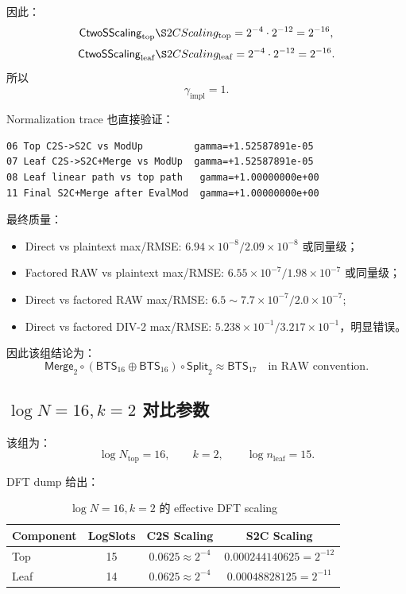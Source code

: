 \documentclass[UTF8,a4paper,11pt]{ctexart}
\newcommand{\Split}{\mathsf{Split}}
\newcommand{\Merge}{\mathsf{Merge}}
\newcommand{\BTS}{\mathsf{BTS}}
\newcommand{\CtwoSScaling}{\mathsf{CtwoSScaling}}
\begin{document}
因此：
\begin{equation}
\CtwoSScaling_{\mathrm{top}}\S2CScaling_{\mathrm{top}}
=2^{-4}\cdot2^{-12}=2^{-16},
\end{equation}
\begin{equation}
\CtwoSScaling_{\mathrm{leaf}}\S2CScaling_{\mathrm{leaf}}
=2^{-4}\cdot2^{-12}=2^{-16}.
\end{equation}
所以
\begin{equation}
\boxed{\gamma_{\mathrm{impl}}=1.}
\end{equation}

Normalization trace 也直接验证：
\begin{lstlisting}[style=textstyle,caption={$\log N=17,k=2$ normalization trace 摘要}]
06 Top C2S->S2C vs ModUp         gamma=+1.52587891e-05
07 Leaf C2S->S2C+Merge vs ModUp  gamma=+1.52587891e-05
08 Leaf linear path vs top path   gamma=+1.00000000e+00
11 Final S2C+Merge after EvalMod  gamma=+1.00000000e+00
\end{lstlisting}

最终质量：
\begin{itemize}[leftmargin=2em]
\item Direct vs plaintext max/RMSE: $6.94\times10^{-8}/2.09\times10^{-8}$ 或同量级；
\item Factored RAW vs plaintext max/RMSE: $6.55\times10^{-7}/1.98\times10^{-7}$ 或同量级；
\item Direct vs factored RAW max/RMSE: $6.5\sim7.7\times10^{-7}/2.0\times10^{-7}$;
\item Direct vs factored DIV-2 max/RMSE: $5.238\times10^{-1}/3.217\times10^{-1}$，明显错误。
\end{itemize}

因此该组结论为：
\begin{equation}
\boxed{
\Merge_2\circ(\BTS_{16}\oplus\BTS_{16})\circ\Split_2
\approx
\BTS_{17}
\quad\text{in RAW convention.}
}
\end{equation}

\subsection{$\log N=16,k=2$ 对比参数}

该组为：
\begin{equation}
\log N_{\mathrm{top}}=16,
\qquad
k=2,
\qquad
\log n_{\mathrm{leaf}}=15.
\end{equation}

DFT dump 给出：

\begin{table}[H]
\centering
\caption{$\log N=16,k=2$ 的 effective DFT scaling}
\begin{tabular}{lccc}
\toprule
Component & LogSlots & C2S Scaling & S2C Scaling \\
\midrule
Top & 15 & $0.0625\approx2^{-4}$ & $0.000244140625=2^{-12}$ \\
Leaf & 14 & $0.0625\approx2^{-4}$ & $0.00048828125=2^{-11}$ \\
\bottomrule
\end{tabular}
\end{table}
\end{document}
